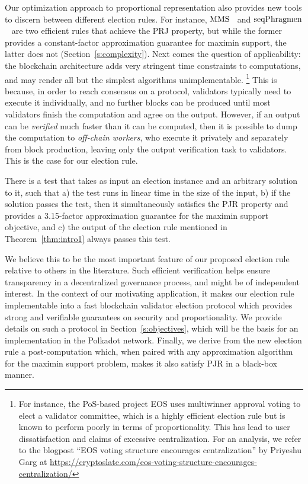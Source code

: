 Our optimization approach to proportional representation also provides new tools to discern between different election rules. For instance, $\operatorname{MMS}$~\cite{sanchez2016maximin} and $\operatorname{seqPhragmen}$~\cite{brill2017phragmen} are two efficient rules that achieve the PRJ property, but while the former provides a constant-factor approximation guarantee for maximin support, the latter does not (Section~\ref{s:complexity}). 
%
Next comes the question of applicability: the blockchain architecture adds very stringent time constraints to computations, and may render all but the simplest algorithms unimplementable.%
%
\footnote{For instance, the PoS-based project EOS uses multiwinner approval voting to elect a validator committee, which is a highly efficient election rule but is known to perform poorly in terms of proportionality. This has lead to user dissatisfaction and claims of excessive centralization. 
For an analysis, we refer to the blogpost ``EOS voting structure encourages centralization'' by Priyeshu Garg at \url{https://cryptoslate.com/eos-voting-structure-encourages-centralization/}} %
% 
This is because, in order to reach consensus on a protocol, validators typically need to execute it individually, and no further blocks can be produced until most validators finish the computation and agree on the output. 
However, if an output can be \emph{verified} much faster than it can be computed, then it is possible to dump the computation to \emph{off-chain workers}, who execute it privately and separately from block production, leaving only the output verification task to validators. This is the case for our election rule.

\begin{theorem}\label{thm:intro2}
There is a test that takes as input an election instance and an arbitrary solution to it, such that a) the test runs in linear time in the size of the input, b) if the solution passes the test, then it simultaneously satisfies the PJR property and provides a 3.15-factor approximation guarantee for the maximin support objective, and c) the output of the election rule mentioned in Theorem~\ref{thm:intro1} always passes this test.
\end{theorem}

 We believe this to be the most important feature of our proposed election rule relative to others in the literature. 
Such efficient verification helps ensure transparency in a decentralized governance process, and might be of independent interest.  
In the context of our motivating application, it makes our election rule implementable into a fast blockchain validator election protocol which provides strong and verifiable guarantees on security and proportionality. 
We provide details on such a protocol in Section~\ref{s:objectives}, which will be the basis for an implementation in the Polkadot network.
%
Finally, we derive from the new election rule a post-computation which, when paired with any approximation algorithm for the maximin support problem, makes it also satisfy PJR in a black-box manner.

